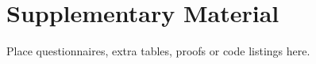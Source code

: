 \chapter{Supplementary Material}
\label{app:a}

Place questionnaires, extra tables, proofs or code listings here.
